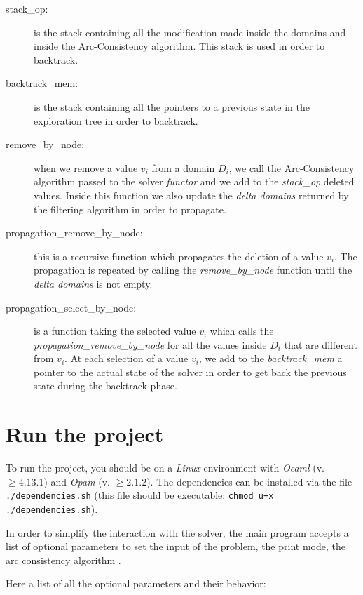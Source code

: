 \documentclass{rapport}
\begin{document}
\begin{description}
  \item[stack\_op:] is the stack containing all the modification made inside the domains and inside the Arc-Consistency algorithm. This stack is used in order to backtrack.

  \item[backtrack\_mem:] is the stack containing all the pointers to a previous state in the exploration tree in order to backtrack.

  \item[remove\_by\_node:] when we remove a value $v_i$ from a domain $D_i$, we call the Arc-Consistency algorithm passed to the solver \textit{functor} and we add to the \textit{stack\_op} deleted values. Inside this function we also update the \textit{delta domains} returned by the filtering algorithm in order to propagate.

  \item[propagation\_remove\_by\_node:] this is a recursive function which propagates the deletion of a value $v_i$. The propagation is repeated by calling the \textit{remove\_by\_node} function until the \textit{delta domains} is not empty.

  \item[propagation\_select\_by\_node:] is a function taking the selected value $v_i$ which calls the \textit{propagation\_remove\_by\_node} for all the values inside $D_i$ that are different from $v_i$. At each selection of a value $v_i$, we add to the \textit{backtrack\_mem} a pointer to the actual state of the solver in order to get back the previous state during the backtrack phase.
\end{description}

\section{Run the project}
\label{sec:arg}
To run the project, you should be on a \textit{Linux} environment with \textit{Ocaml} (v. $\geq 4.13.1$) and \textit{Opam} (v. $\geq 2.1.2$). The dependencies can be installed via the file \texttt{./dependencies.sh} (this file should be executable: \texttt{chmod u+x ./dependencies.sh}).

In order to simplify the interaction with the solver, the main program accepts a list of optional parameters to set the input of the problem, the print mode, the arc consistency algorithm \etc.

Here a list of all the optional parameters and their behavior:
\end{document}
